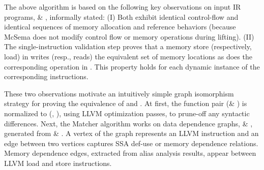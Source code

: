 The above algorithm is based on the following key observations on input IR 
programs,  \& \Tp, informally stated:
%
(I) Both exhibit identical control-flow and identical sequences of memory allocation
and reference behaviors (because McSema does not modify control flow or memory operations
during lifting).
%
(II) The single-instruction validation step proves that a memory store 
(respectively, load) in  writes (resp., reads) the equivalent set of memory
locations as does the corresponding operation in \Tp.  This property holds for
each dynamic instance of the corresponding instructions.

%


These two observations motivate an intuitively simple graph isomorphism strategy for
proving the equivalence of \T and \Tp.
%
At first, the function pair (\F \& \FP) is normalized to (\FN, \FNP), using LLVM optimization
passes, to prune-off any syntactic differences. 
%
Next, the Matcher algorithm works on data dependence graphs, \GN \& \GNP, generated  
from \FN \& \FNP. A vertex of the graph represents an 
LLVM instruction and an edge between two vertices captures SSA def-use  or   
memory 
dependence relations. Memory dependence edges, extracted from alias analysis 
results, appear between LLVM load and 
store instructions.

